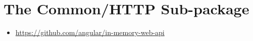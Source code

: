 \chapter{The Common/HTTP Sub-package}




\begin{itemize}
  \item \url{https://github.com/angular/in-memory-web-api}
\end{itemize}





